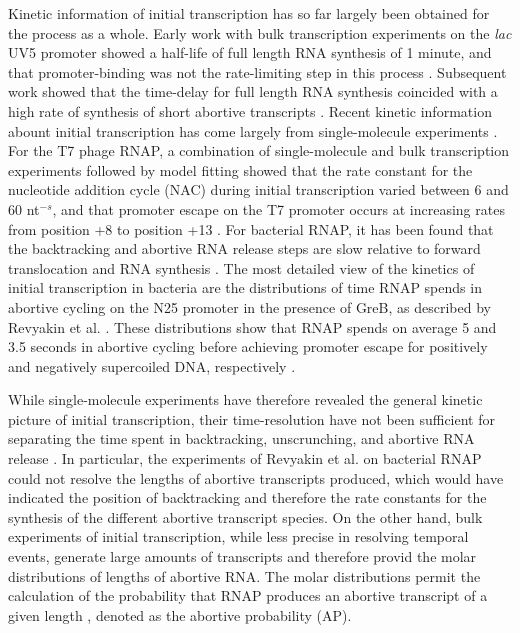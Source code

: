 Kinetic information of initial transcription has so far largely been obtained
for the process as a whole. Early work with bulk transcription experiments on
the \textit{lac} UV5 promoter showed a half-life of full length RNA
synthesis of 1 minute, and that promoter-binding was not the rate-limiting
step in this process \cite{stefano_lac_1979}. Subsequent work showed that the
time-delay for full length RNA synthesis coincided with a high rate of
synthesis of short abortive transcripts \cite{munson_abortive_1981}. Recent
kinetic information abount initial transcription has come largely from
single-molecule experiments \cite{revyakin_abortive_2006, kapanidis_initial_2006,
kapanidis_retention_2005, margeat_direct_2006, tang_real-time_2009}. For the
T7 phage RNAP, a combination of single-molecule and bulk transcription
experiments followed by model fitting showed that the rate constant for the
nucleotide addition cycle (NAC) during initial transcription varied between 6
and 60 nt$^{-s}$, and that promoter escape on the T7 promoter occurs at
increasing rates from position +8 to position +13 \cite{tang_real-time_2009}.
For bacterial RNAP, it has been found that the backtracking and abortive
RNA release steps are slow relative to forward translocation and RNA synthesis
\cite{margeat_direct_2006, revyakin_abortive_2006}. The most detailed view of
the kinetics of initial transcription in bacteria are the
distributions of time RNAP spends in abortive cycling on the N25 promoter in
the presence of GreB, as described by Revyakin et al.
\cite{revyakin_abortive_2006}. These distributions show that RNAP spends on
average 5 and 3.5 seconds in abortive cycling before achieving promoter escape
for positively and negatively supercoiled DNA, respectively
\cite{revyakin_abortive_2006}.

While single-molecule experiments have therefore revealed the general kinetic
picture of initial transcription, their time-resolution have not been
sufficient for separating the time spent in backtracking, unscrunching, and
abortive RNA release \cite{revyakin_abortive_2006, margeat_direct_2006}. In
particular, the experiments of Revyakin et al. on bacterial RNAP could not
resolve the lengths of abortive transcripts produced, which would have
indicated the position of backtracking and therefore the rate constants for
the synthesis of the different abortive transcript species. On the other
hand, bulk experiments of initial transcription, while less precise in
resolving temporal events, generate large amounts of transcripts and therefore
provid the molar distributions of lengths of abortive RNA. The molar
distributions permit the calculation of the probability that RNAP produces an
abortive transcript of a given length \cite{hsu_quantitative_1996,
hsu_promoter_2002}, denoted as the abortive probability (AP).

